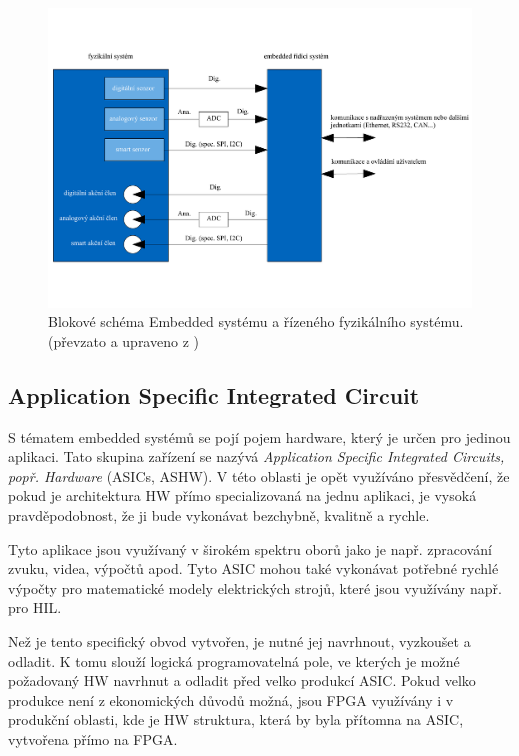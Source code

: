 \documentclass[a4paper, twoside, 11pt]{article}
\newcommand{\fbar}{\FloatBarrier}
\begin{document}
	\begin{figure}[htbp!]
		\centering
			\includegraphics[width=1\textwidth]{src/pdf/embedded-system-scheme.pdf} 
			\caption{Blokové schéma Embedded systému a řízeného fyzikálního systému. (převzato a upraveno z \cite{juan-fpgas})}
			\label{fig:embedded-system-scheme}
	\end{figure}

		\fbar
		\subsection{Application Specific Integrated Circuit}
		S tématem embedded systémů se pojí pojem hardware, který je určen pro jedinou aplikaci. Tato skupina zařízení se nazývá \textit{Application Specific Integrated Circuits, popř. Hardware} (ASICs, ASHW). V této oblasti je opět využíváno přesvědčení, že pokud je architektura HW přímo specializovaná na jednu aplikaci, je vysoká pravděpodobnost, že ji bude vykonávat bezchybně, kvalitně a rychle.\par
		Tyto aplikace jsou využívaný v širokém spektru oborů jako je např. zpracování zvuku, videa, výpočtů apod. Tyto ASIC mohou také vykonávat potřebné rychlé výpočty pro matematické modely elektrických strojů, které jsou využívány např. pro HIL.\par
		Než je tento specifický obvod vytvořen, je nutné jej navrhnout, vyzkoušet a odladit. K tomu slouží logická programovatelná pole, ve kterých je možné požadovaný HW navrhnut a odladit před velko produkcí ASIC. Pokud velko produkce není z ekonomických důvodů možná, jsou FPGA využívány i v produkční oblasti, kde je HW struktura, která by byla přítomna na ASIC, vytvořena přímo na FPGA.
\end{document}
